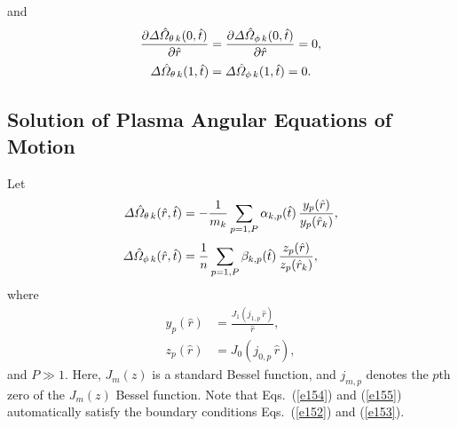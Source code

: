 \documentclass[12pt]{article}
\begin{document}
and
\begin{align}
\frac{\partial{\mit\Delta}{\hat{\mit\Omega}}_{\theta\,k}(0,\hat{t})}{\partial \hat{r}} &=
\frac{\partial{\mit\Delta}\hat{\mit\Omega}_{\phi\,k}(0,\hat{t})}{\partial \hat{r}} =0,\label{e152}\\[0.5ex]
{\mit\Delta}\hat{\mit\Omega}_{\theta\,k}(1,\hat{t})&={\mit\Delta}\hat{\mit\Omega}_{\phi\,k}(1,\hat{t})=0.\label{e153}
\end{align}

\subsection{Solution of Plasma Angular Equations of Motion}
Let
\begin{align}\label{e154}
{\mit\Delta}\hat{\mit\Omega}_{\theta\,k}(\hat{r},\hat{t})&=-\frac{1}{m_k}\sum_{p=1,P} \alpha_{k,p}(\hat{t})\,\frac{y_p(\hat{r})}{y_p(\hat{r}_k)},\\[0.5ex]
{\mit\Delta}\hat{\mit\Omega}_{\phi\,k}(\hat{r},\hat{t})&=\frac{1}{n}\sum_{p=1,P} \beta_{k,p}(\hat{t})\,\frac{z_p(\hat{r})}{z_p(\hat{r}_k)},\label{e155}
\end{align}
where
\begin{align}
y_p(\hat{r}) &=\frac{J_1(j_{1,p}\,\hat{r})}{\hat{r}},\\[0.5ex]
z_p(\hat{r}) &= J_0(j_{0,p}\,\hat{r}),\label{e158}
\end{align}
and $P\gg 1$. 
Here, $J_m(z)$ is a standard Bessel function, and $j_{m,p}$ denotes the $p$th zero of the $J_m(z)$ Bessel function. 
Note that  Eqs.~(\ref{e154}) and (\ref{e155}) automatically  satisfy the boundary conditions Eqs.~(\ref{e152}) and (\ref{e153}). 
\end{document}
